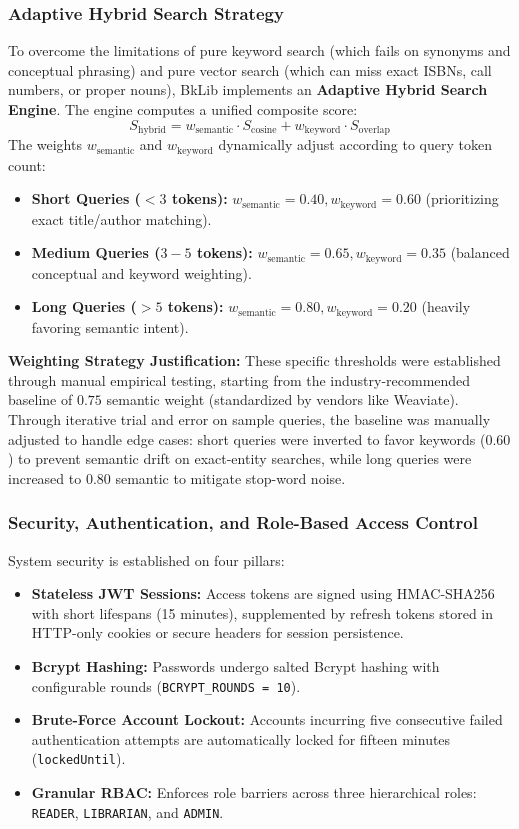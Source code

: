 \subsubsection{Adaptive Hybrid Search Strategy}
To overcome the limitations of pure keyword search (which fails on synonyms and conceptual phrasing) and pure vector search (which can miss exact ISBNs, call numbers, or proper nouns), BkLib implements an \textbf{Adaptive Hybrid Search Engine}. The engine computes a unified composite score:
\begin{equation}
    S_{\text{hybrid}} = w_{\text{semantic}} \cdot S_{\text{cosine}} + w_{\text{keyword}} \cdot S_{\text{overlap}}
\end{equation}
The weights $w_{\text{semantic}}$ and $w_{\text{keyword}}$ dynamically adjust according to query token count:
\begin{itemize}
    \item \textbf{Short Queries ($<3$ tokens):} $w_{\text{semantic}} = 0.40, w_{\text{keyword}} = 0.60$ (prioritizing exact title/author matching).
    \item \textbf{Medium Queries ($3-5$ tokens):} $w_{\text{semantic}} = 0.65, w_{\text{keyword}} = 0.35$ (balanced conceptual and keyword weighting).
    \item \textbf{Long Queries ($>5$ tokens):} $w_{\text{semantic}} = 0.80, w_{\text{keyword}} = 0.20$ (heavily favoring semantic intent).
\end{itemize}

\textbf{Weighting Strategy Justification:}
These specific thresholds were established through manual empirical testing, starting from the industry-recommended baseline of $0.75$ semantic weight (standardized by vendors like Weaviate). Through iterative trial and error on sample queries, the baseline was manually adjusted to handle edge cases: short queries were inverted to favor keywords ($0.60$) to prevent semantic drift on exact-entity searches, while long queries were increased to $0.80$ semantic to mitigate stop-word noise. 

\subsubsection{Security, Authentication, and Role-Based Access Control}
System security is established on four pillars:
\begin{itemize}
    \item \textbf{Stateless JWT Sessions:} Access tokens are signed using HMAC-SHA256 with short lifespans (15 minutes), supplemented by refresh tokens stored in HTTP-only cookies or secure headers for session persistence.
    \item \textbf{Bcrypt Hashing:} Passwords undergo salted Bcrypt hashing with configurable rounds (\texttt{BCRYPT\_ROUNDS = 10}).
    \item \textbf{Brute-Force Account Lockout:} Accounts incurring five consecutive failed authentication attempts are automatically locked for fifteen minutes (\texttt{lockedUntil}).
    \item \textbf{Granular RBAC:} Enforces role barriers across three hierarchical roles: \texttt{READER}, \texttt{LIBRARIAN}, and \texttt{ADMIN}.
\end{itemize}


